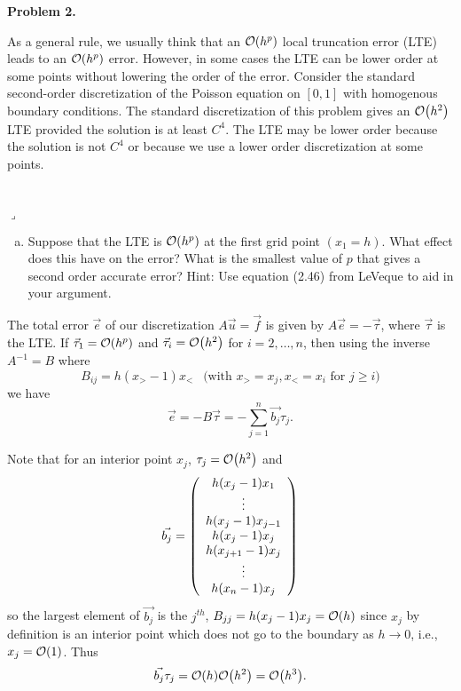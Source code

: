 \documentclass[12pt]{article}
\newenvironment{myprob}[1]
    {%
    \noindent{\Huge$\ulcorner$}\textbf{#1.}\begin{em}
    }
    { 
    \end{em} \\ \hphantom{l} \hfill {\Huge$\lrcorner$} }
\begin{document}
\begin{myprob}{Problem 2}
As a general rule, we usually think that an $\order{h^p}$ local truncation error (LTE) leads to an $\order{h^p}$ error. However, in some cases the LTE can be lower order at some points without lowering the order of the error.  Consider the standard second-order discretization of the Poisson equation on $[0,1]$ with homogenous boundary conditions.  The standard discretization of this problem gives an $\order{h^2}$ LTE provided the solution is at least $C^4$.  The LTE may be lower order because the solution is not $C^4$ or because we use a lower order discretization at some points.
\end{myprob}
\begin{enumerate}[(a)]
\item Suppose that the LTE is $\order{h^p}$ at the first grid point $(x_1 = h)$. What effect does this have on the error? What is the smallest value of $p$ that gives a second order accurate error?  Hint: Use equation (2.46) from LeVeque to aid in your argument.
\end{enumerate}

The total error $\vec{e}$ of our discretization $A \vec{u} = \vec{f}$
is given by $A\vec{e} = -\vec{\tau}$, where $\vec{\tau}$ is the LTE.  If $\vec{\tau}_1 = \order{h^p}$ and $\vec{\tau}_i = \order{h^2}$ for $i=2,\dots, n$, then using the inverse $A^{-1}= B$ where $$B_{ij} = h(x_> - 1)x_< \ \ \text{ (with }x_> = x_j, x_< = x_i \text{ for }j\geq i)$$ we have
$$ \vec{e} = -B \vec{\tau} = -\sum_{j=1}^n \vec{b_j} \tau_j.$$

\noindent Note that for an interior point $x_j$, $\tau_j = \order{h^2}$ and
\begin{align*}
\vec{b_j} = \qty(\begin{array}{c}
              h(x_j - 1)x_1 \\
               \vdots \\
               h(x_j - 1)x_{j-1} \\
               h(x_j - 1)x_{j} \\
               h(x_{j+1} - 1)x_{j} \\
               \vdots \\
               h(x_n - 1)x_j   
            \end{array})
\end{align*}
so the largest element of $\vec{b_j}$ is the $j^{th}$, $B_{jj} = h(x_j - 1)x_j  = \order{h}$ since $x_j$ by definition is an interior point which does not go to the boundary as $h\to0$, i.e., $x_j = \order{1}$.  Thus $$\vec{b_j}\tau_j = \order{h} \order{h^2} = \order{h^3}.$$
\end{document}
